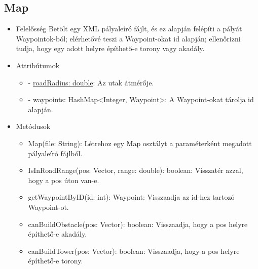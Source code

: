\subsection{Map}
\begin{itemize}
\item Felelősség\newline
Betölt egy XML pályaleíró fájlt, és ez alapján felépíti a pályát Waypointok-ból; elérhetővé teszi a Waypoint-okat id alapján; ellenőrizni tudja, hogy egy adott helyre építhető-e torony vagy akadály.
\item Attribútumok\newline
	\begin{itemize}
		\item - \underline{roadRadius: double}: Az utak átmérője.
		\item - waypoints: HashMap<Integer, Waypoint>: A Waypoint-okat tárolja id alapján.
	\end{itemize}
\item Metódusok\newline
	\begin{itemize}
		\item Map(file: String): Létrehoz egy Map osztályt a paraméterként megadott pályaleíró fájlból.
		\item IsInRoadRange(pos: Vector, range: double): boolean: Visszatér azzal, hogy a pos úton van-e.
		\item getWaypointByID(id: int): Waypoint: Visszaadja az id-hez tartozó Waypoint-ot.
		\item canBuildObstacle(pos: Vector): boolean: Visszaadja, hogy a pos helyre építhető-e akadály.
		\item canBuildTower(pos: Vector): boolean: Visszaadja, hogy a pos helyre építhető-e torony.
	\end{itemize}
\end{itemize}

